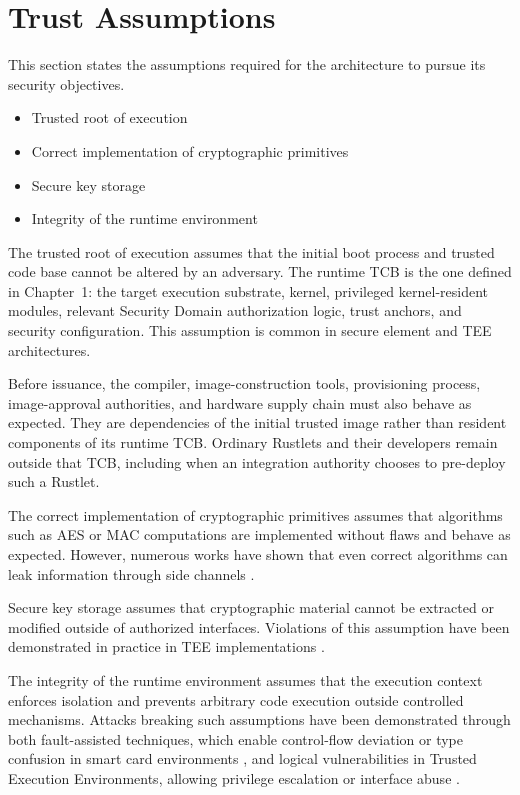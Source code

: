 \section{Trust Assumptions}

This section states the assumptions required for the architecture to pursue its
security objectives.

\begin{itemize}
\item Trusted root of execution
\item Correct implementation of cryptographic primitives
\item Secure key storage
\item Integrity of the runtime environment
\end{itemize}

The trusted root of execution assumes that the initial boot process and trusted
code base cannot be altered by an adversary. The runtime TCB is the one defined
in Chapter~1: the target execution substrate, kernel, privileged kernel-resident
modules, relevant Security Domain authorization logic, trust anchors, and
security configuration. This assumption is common in secure element and TEE
architectures.

Before issuance, the compiler, image-construction tools, provisioning process,
image-approval authorities, and hardware supply chain must also behave as
expected. They are dependencies of the initial trusted image rather than
resident components of its runtime TCB. Ordinary Rustlets and their developers
remain outside that TCB, including when an integration authority chooses to
pre-deploy such a Rustlet.

The correct implementation of cryptographic primitives assumes that algorithms
such as AES or MAC computations are implemented without flaws and behave as
expected. However, numerous works have shown that even correct algorithms can
leak information through side channels \cite{kocher1996timing, kocher1999dpa}.

Secure key storage assumes that cryptographic material cannot be extracted or
modified outside of authorized interfaces. Violations of this assumption have
been demonstrated in practice in TEE implementations \cite{bouffard2014reverse,
shakevsky2022keymaster}.

The integrity of the runtime environment assumes that the execution context
enforces isolation and prevents arbitrary code execution outside controlled
mechanisms.  Attacks breaking such assumptions have been demonstrated through
both fault-assisted techniques, which enable control-flow deviation or type
confusion in smart card environments \cite{dubreuil2012fault,
razafindralambo2012virus}, and logical vulnerabilities in Trusted Execution
Environments, allowing privilege escalation or interface abuse
\cite{busch2024globalconfusion}.

